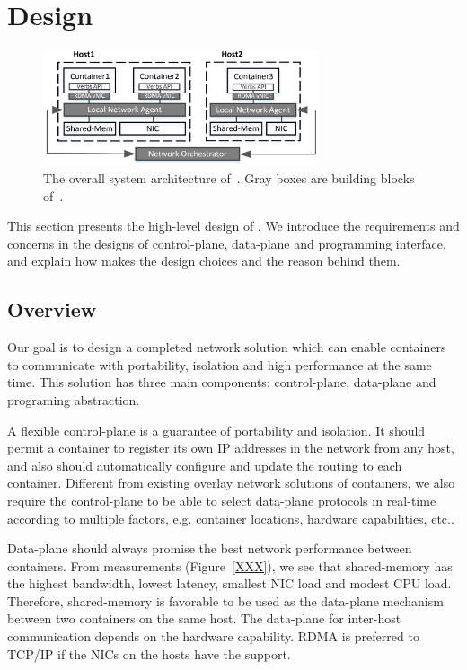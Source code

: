 \section{Design} \label{sec:design}

\begin{figure}[t!] 
     \centering 
     \includegraphics[width=3.2in]{figures/system-arch.png} 
    \caption{\label{fig:sysarch} The overall system architecture of~\sysname. Gray boxes are building blocks of~\sysname.} 
\end{figure} 

This section presents the high-level design of \sysname. We introduce
the requirements and concerns in the designs of control-plane, data-plane
and programming interface, and explain how \sysname makes the design choices
and the reason behind them.

\subsection{Overview}

Our goal is to design a completed network solution which can enable containers
to communicate with portability, isolation and high performance at the same time.
This solution has three main components: control-plane, data-plane and programing
abstraction. 

A flexible control-plane is a guarantee of portability and isolation. 
It should permit a container to register its own IP addresses in the network
from any host, and also should automatically configure and update the routing 
to each container. Different from existing overlay network solutions of 
containers, we also require the control-plane to be able to select 
data-plane protocols in real-time according to multiple factors, 
e.g. container locations, hardware capabilities, etc..

Data-plane should always promise the best network performance between 
containers. From measurements (Figure~\ref{XXX}), 
we see that shared-memory has the highest
bandwidth, lowest latency, smallest NIC load and modest CPU load. 
Therefore, shared-memory is favorable to be used as the data-plane 
mechanism between two containers on the same host. 
The data-plane for inter-host communication
depends on the hardware capability. RDMA is preferred to TCP/IP if the NICs
on the hosts have the support.

